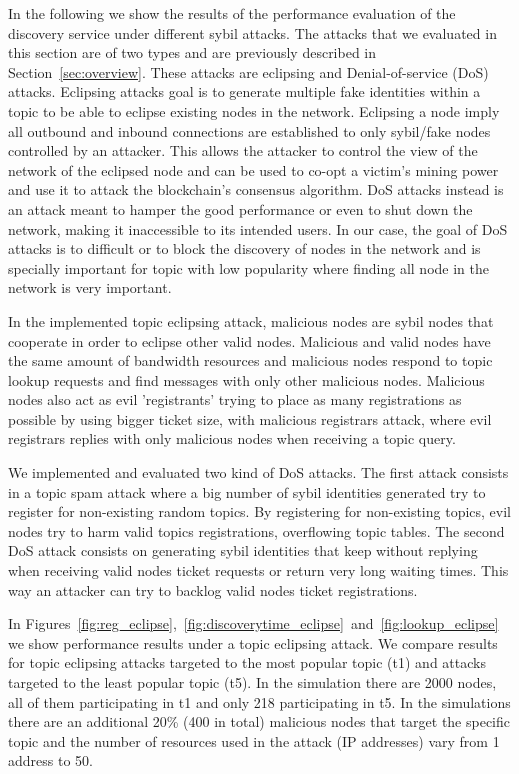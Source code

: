 In the following we show the results of the performance evaluation of the discovery service under different sybil attacks.  The attacks that we evaluated in this section are of two types and are previously described in Section~\ref{sec:overview}. 
These attacks are eclipsing  and Denial-of-service (DoS) attacks.
Eclipsing attacks goal is to generate multiple fake identities within a topic to be able to eclipse existing nodes in the network.
Eclipsing a node imply all outbound and inbound connections are established to only sybil/fake nodes controlled by an attacker.
This allows the attacker to control the view of the network of the eclipsed node and can be used to co-opt a victim's mining power and use it to attack the blockchain's consensus algorithm.
DoS attacks instead is an attack meant to hamper the good performance or even to shut down the network, making it inaccessible to its intended users.  
In our case,  the goal of DoS attacks is to difficult or to block the discovery of nodes in the network and is specially important for topic with low popularity where finding all node in the network is very important.

In the implemented topic eclipsing attack,  malicious nodes are sybil nodes that cooperate in order to eclipse other valid nodes.
Malicious and valid nodes have the same amount of bandwidth resources and malicious nodes respond to topic lookup requests and find messages with only other malicious nodes.
Malicious nodes also act as evil 'registrants' trying to place as many registrations as possible by using bigger ticket size,  with malicious registrars attack,  where evil registrars replies with only malicious nodes when receiving a topic query.

We implemented and evaluated two kind of DoS attacks.  
The first attack consists in a topic spam attack where a big number of sybil identities generated try to register for non-existing random topics.
By registering for non-existing topics,  evil nodes try to harm valid topics registrations, overflowing topic tables.
The second DoS attack consists on generating sybil identities that keep without replying when receiving valid nodes ticket requests or return very long waiting times. 
This way an attacker can try to backlog valid nodes ticket registrations.

In Figures~\ref{fig:reg_eclipse},~\ref{fig:discoverytime_eclipse}~and~\ref{fig:lookup_eclipse} we show performance results under a
topic eclipsing attack.
We compare results for topic eclipsing attacks targeted to the most popular topic (t1) and attacks targeted to the least popular topic (t5). 
In the simulation there are 2000 nodes, all of them participating in t1 and only 218 participating in t5. 
In the simulations there are an additional 20\% (400 in total) malicious nodes that target the specific topic and the number of resources used in the attack (IP addresses) vary from 1 address to 50.

